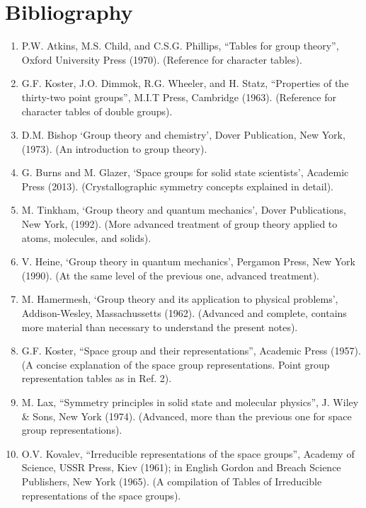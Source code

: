 \documentclass[12pt,a4paper,twoside]{report}
\begin{document}
{\color{dark-blue}\chapter{Bibliography}}
\color{black}
\begin{enumerate}

\item
P.W. Atkins, M.S. Child, and C.S.G. Phillips, ``Tables for group theory'',
Oxford University Press (1970). (Reference for character tables).

\item
G.F. Koster, J.O. Dimmok, R.G. Wheeler, and H. Statz, ``Properties
of the thirty-two point groups'', M.I.T Press, Cambridge (1963). 
(Reference for character tables of double groups).

\item
D.M. Bishop `Group theory and chemistry', Dover Publication, New York, (1973).
(An introduction to group theory).

\item
G. Burns and M. Glazer, `Space groups for solid state scientists', Academic Press
(2013). (Crystallographic symmetry concepts explained in detail). 

\item
M. Tinkham, `Group theory and quantum mechanics', Dover Publications, New York,
(1992). (More advanced treatment of group theory applied to atoms, molecules,
and solids).

\item
V. Heine, `Group theory in quantum mechanics', Pergamon Press, New York (1990).
(At the same level of the previous one, advanced treatment).

\item
M. Hamermesh, `Group theory and its application to physical problems',
Addison-Wesley, Massachussetts (1962). 
(Advanced and complete, contains more material than necessary to
understand the present notes).

\item
G.F. Koster, ``Space group and their representations'', Academic Press (1957).
(A concise explanation of the space group representations. Point
group representation tables as in Ref. 2).

\item
M. Lax, ``Symmetry principles in solid state and molecular physics'',
J. Wiley \& Sons, New York (1974).
(Advanced, more than the previous one for space group representations).

\item
O.V. Kovalev, ``Irreducible representations of the space groups'',
Academy of Science, USSR Press, Kiev (1961); in English
Gordon and Breach Science Publishers, New York (1965).
(A compilation of Tables of Irreducible representations of the space groups).


\end{enumerate}
\end{document}

